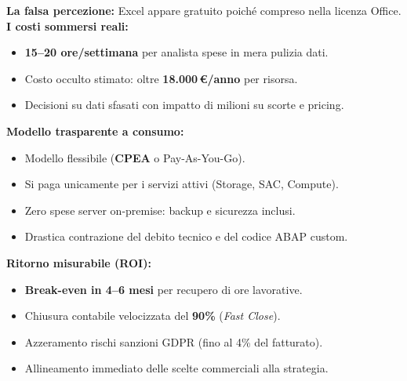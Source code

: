\documentclass[a4paper,10pt]{extarticle}
\begin{document}
\begin{tcbraster}[raster columns=3, raster equal height, raster column skip=6pt]
  \begin{tcolorbox}[
    cardbase,
    colback=legacybg,
    colframe=legacyred,
    colbacktitle=legacyred,
    title={\fontsize{8}{9.5}\selectfont\bfseries\color{white}1. L'Illusione del Costo Zero}
  ]
    \fontsize{7.3}{9}\selectfont
    \textbf{La falsa percezione:} Excel appare gratuito poich\'e compreso nella licenza Office.\\
    \textbf{I costi sommersi reali:}
    \begin{itemize}[leftmargin=7pt, itemsep=1.5pt, topsep=1.5pt]
      \item \textbf{15--20 ore/settimana} per analista spese in mera pulizia dati.
      \item Costo occulto stimato: oltre \textbf{18.000\,\euro{}/anno} per risorsa.
      \item Decisioni su dati sfasati con impatto di milioni su scorte e pricing.
    \end{itemize}
  \end{tcolorbox}
  \begin{tcolorbox}[
    cardbase,
    colback=sapaccent,
    colframe=sapblue,
    colbacktitle=sapblue,
    title={\fontsize{8}{9.5}\selectfont\bfseries\color{white}2. L'Investimento BTP}
  ]
    \fontsize{7.3}{9}\selectfont
    \textbf{Modello trasparente a consumo:}
    \begin{itemize}[leftmargin=7pt, itemsep=1.5pt, topsep=1.5pt]
      \item Modello flessibile (\textbf{CPEA} o Pay-As-You-Go).
      \item Si paga unicamente per i servizi attivi (Storage, SAC, Compute).
      \item Zero spese server on-premise: backup e sicurezza inclusi.
      \item Drastica contrazione del debito tecnico e del codice ABAP custom.
    \end{itemize}
  \end{tcolorbox}
  \begin{tcolorbox}[
    cardbase,
    colback=modernbg,
    colframe=modernteal,
    colbacktitle=modernteal,
    title={\fontsize{8}{9.5}\selectfont\bfseries\color{white}3. Il Ritorno sull'Investimento}
  ]
    \fontsize{7.3}{9}\selectfont
    \textbf{Ritorno misurabile (ROI):}
    \begin{itemize}[leftmargin=7pt, itemsep=1.5pt, topsep=1.5pt]
      \item \textbf{Break-even in 4--6 mesi} per recupero di ore lavorative.
      \item Chiusura contabile velocizzata del \textbf{90\%} (\textit{Fast Close}).
      \item Azzeramento rischi sanzioni GDPR (fino al 4\% del fatturato).
      \item Allineamento immediato delle scelte commerciali alla strategia.
    \end{itemize}
  \end{tcolorbox}
\end{tcbraster}
\end{document}
